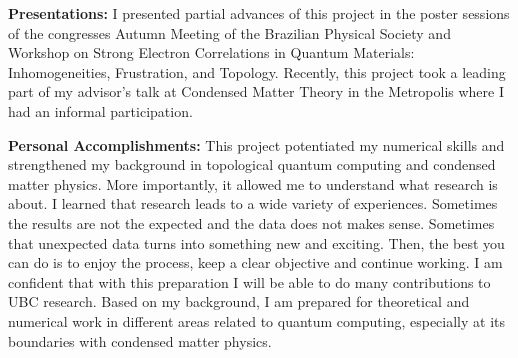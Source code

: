 \noindent \textbf{Presentations:}  I presented partial advances of this project in the poster sessions of the congresses Autumn Meeting of the Brazilian Physical Society and Workshop on Strong Electron Correlations in Quantum Materials: Inhomogeneities, Frustration, and Topology. Recently, this project took a leading part of my advisor’s talk at Condensed Matter Theory in the Metropolis where I had an informal participation.

\noindent \textbf{Personal Accomplishments: } This project potentiated my numerical skills and strengthened my background in topological quantum computing and condensed matter physics. More importantly, it allowed me to understand what research is about. I learned that research leads to a wide variety of experiences. Sometimes the results are not the expected and the data does not makes sense. Sometimes that unexpected data turns into something new and exciting. Then, the best you can do is to enjoy the process,  keep a clear objective and continue working. I am confident that with this preparation I will be able to do many contributions to UBC research. Based on my background, I am prepared for theoretical and numerical work in different areas related to quantum computing, especially at its boundaries with condensed matter physics. 
